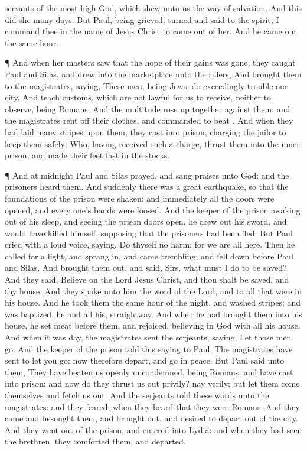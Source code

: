 {servants of the most
high
God,
which shew
unto
us the
way of
salvation.
And
this did
she
many
days.
But
Paul, being
grieved,
turned
and
said to the
spirit, I
command
thee
in the
name of
Jesus
Christ to come
out
of
her.
And he came
out the
same
hour.
\par }{\PP {}¶
And when
her
masters
saw
that the
hope of
their
gains was
gone, they
caught
Paul
and
Silas, and
drew
{}
into the
marketplace
unto the
rulers,
And
brought
them to the
magistrates,
saying,
These
men,
being
Jews, do exceedingly
trouble
our
city,
And
teach
customs,
which
are
not
lawful for
us to
receive,
neither to
observe,
being
Romans.
And the
multitude rose up
together
against
them:
and the
magistrates rent
off
their
clothes, and
commanded to
beat
{}.
And when they had
laid
many
stripes upon
them, they
cast
{}
into
prison,
charging the
jailor to
keep
them
safely:
Who, having
received
such a
charge,
thrust
them
into the
inner
prison,
and
made
their
feet
fast
in the
stocks.
\par }{\PP {}¶
And
at
midnight
Paul
and
Silas
prayed, and sang
praises unto
God:
and the
prisoners
heard
them.
And
suddenly there
was a
great
earthquake, so
that the
foundations of the
prison were
shaken:
and
immediately
all the
doors were
opened,
and every
one’s
bands were
loosed.
And the keeper of the
prison awaking
out of his
sleep,
and
seeing the
prison
doors
open, he drew
out his
sword, and
would have
killed
himself, supposing
that the
prisoners had been
fled.
But
Paul
cried with a
loud
voice,
saying,
Do
thyself
no
harm:
for we
are
all
here.
Then he
called for a
light, and sprang
in,
and
came
trembling, and fell
down before
Paul
and
Silas,
And
brought
them
out, and
said,
Sirs,
what
must
I
do to
be
saved?
And they
said,
Believe
on the
Lord
Jesus
Christ,
and
thou shalt be
saved,
and
thy
house.
And they
spake unto
him the
word of the
Lord,
and to
all that
were
in
his
house.
And he
took
them the
same
hour of the
night, and
washed
{}
stripes;
and was
baptized,
he
and
all
his,
straightway.
And when he had
brought
them
into
his
house, he
set
meat before
them,
and
rejoiced,
believing in
God with all his
house.
And
when it was
day, the
magistrates
sent the
serjeants,
saying,
Let
those
men
go.
And the keeper of the
prison
told
this
saying
to
Paul, The
magistrates have
sent
to let you
go:
now
therefore
depart, and
go
in
peace.
But
Paul
said
unto
them, They have
beaten
us
openly
uncondemned,
being
Romans, and have
cast
{}
into
prison;
and
now do they
thrust
us
out
privily?
nay
verily;
but let them
come
themselves and
fetch
us
out.
And the
serjeants
told
these
words unto the
magistrates:
and they
feared, when they
heard
that they
were
Romans.
And they
came and
besought
them,
and
brought
{}
out, and
desired
{} to
depart out of the
city.
And they
went out
of the
prison, and
entered
into
{}
Lydia:
and when they had
seen the
brethren, they
comforted
them,
and
departed.

}

